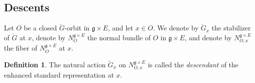 \documentclass[12pt]{amsart}
\newtheorem{theorem}[lm]{Theorem}
\theoremstyle{definition}
\newtheorem{defn}[lm]{Definition}
\theoremstyle{remark}\newtheorem{rmk}[lm]{Remark}
\newcommand{\RO}{{\mathrm {O}}}
\newcommand{\GL}{{\mathrm{GL}}}
\newcommand{\Sp}{{\mathrm{Sp}}}
\newcommand{\triv}{\mathrm{triv}}
\newcommand{\g}{\mathfrak g}
\renewcommand{\o}{\mathfrak o}
\newcommand{\gl}{\mathfrak g \mathfrak l}
\renewcommand{\sp}{\mathfrak s \mathfrak p}
\newcommand{\C}{\mathbb{F}}
\begin{document}
	\subsection{Descents}
    Let $O$ be a closed $\breve{G}$-orbit in $\g\times E$, and let $x\in O$. We denote by $\breve{G}_x$ the stabilizer of $\breve{G}$ at $x$, denote by $N_O^{\g\times E}$ the normal bundle of $O$ in $\g\times E$, and  denote by $N_{O,x}^{\g\times E}$ the fiber of $N_O^{\g\times E}$ at $x$.
    
	\begin{defn}
		\label{defn:descent}
		The natural action $\breve{G}_x$ on $N_{O,x}^{\g\times E}$ is called the \emph{descendant} of the enhanced standard representation at $x$.
	\end{defn}
%		
%		
%		
\end{document}
